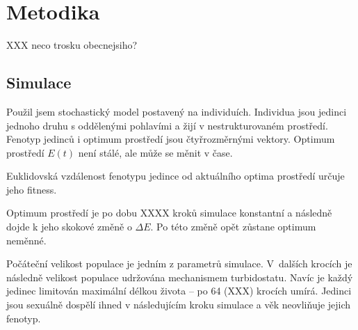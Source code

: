 \chapter{Metodika}



XXX neco trosku obecnejsiho?

\section{Simulace}

Použil jsem stochastický model postavený na individuích. Individua jsou jedinci jednoho druhu s oddělenými pohlavími a
žijí v nestrukturovaném prostředí. Fenotyp jedinců i optimum prostředí jsou čtyřrozměrnými vektory.
Optimum prostředí $E(t)$ není stálé, ale může se měnit v čase.

Euklidovská vzdálenost fenotypu jedince od aktuálního optima prostředí určuje jeho fitness.

Optimum prostředí je po dobu XXXX kroků simulace konstantní a následně dojde k jeho skokové změně o
$\Delta{}E$. Po této změně opět zůstane optimum neměnné.

Počáteční velikost populace je jedním z parametrů simulace. V~dalších krocích je následně velikost populace udržována
mechanismem turbidostatu.
Navíc je každý jedinec limitován maximální délkou života -- po 64 (XXX) krocích umírá.
Jedinci jsou sexuálně dospělí ihned v následujícím kroku simulace a věk neovliňuje jejich fenotyp.



